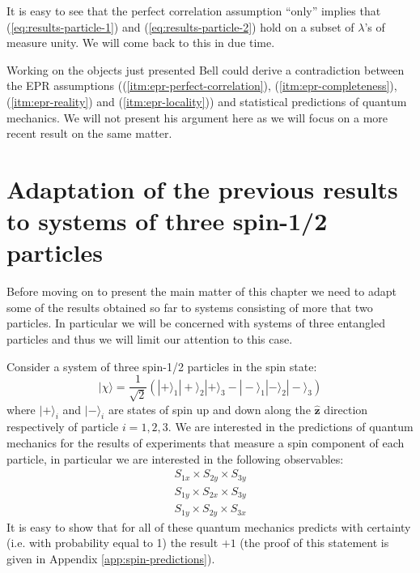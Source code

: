 \begin{remark}
  \label{rem:well-def-ab}
  It is easy to see that the perfect correlation assumption ``only'' implies that (\ref{eq:results-particle-1}) and (\ref{eq:results-particle-2}) hold on a subset of $\lambda$'s of measure unity. We will come back to this in due time.
\end{remark}

\begin{observation}
Working on the objects just presented Bell \cite{Bell1964} could derive a contradiction between the EPR assumptions ((\ref{itm:epr-perfect-correlation}), (\ref{itm:epr-completeness}), (\ref{itm:epr-reality}) and (\ref{itm:epr-locality})) and statistical predictions of quantum mechanics. We will not present his argument here as we will focus on a more recent result on the same matter.
\end{observation}


\section{Adaptation of the previous results to systems of three spin-1/2 particles}
\label{sec:adaptation-to-3-particles}
Before moving on to present the main matter of this chapter we need to adapt some of the results obtained so far to systems consisting of more that two particles. In particular we will be concerned with systems of three entangled particles and thus we will limit our attention to this case.%

Consider a system of three spin-1/2 particles in the spin state:
\begin{equation}
  |\chi\rangle = \frac{1}{\sqrt{2}} \left( |+\rangle_1 |+\rangle_2 |+\rangle_3 - |-\rangle_1 |-\rangle_2 |-\rangle_3 \right)
  \label{eq:ghz-state}
\end{equation}
where $|+\rangle_i$ and $|-\rangle_i$ are states of spin up and down along the $\mathbf{\hat{z}}$ direction respectively of particle $i = 1, 2, 3$.
We are interested in the predictions of quantum mechanics for the results of experiments that measure a spin component of each particle, in particular we are interested in the following observables:
\begin{equation}
  \begin{split}
    S_{1x} \times S_{2y} \times S_{3y}\\
    S_{1y} \times S_{2x} \times S_{3y}\\
    S_{1y} \times S_{2y} \times S_{3x}
  \end{split}
  \label{eq:xyy-observables}
\end{equation}
It is easy to show that for all of these quantum mechanics predicts with certainty (i.e. with probability equal to 1) the result $+ 1$ (the proof of this statement is given in Appendix \ref{app:spin-predictions}).

